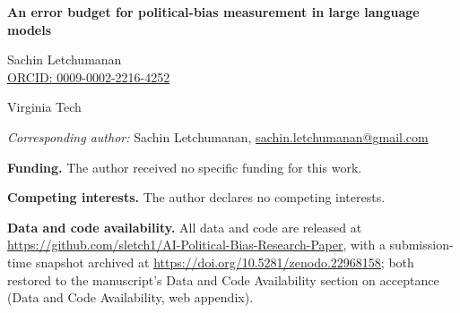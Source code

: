 \documentclass[11pt]{article}
\begin{document}
\begin{center}
{\Large\textbf{An error budget for political-bias measurement in large
language models}}

\vspace{1.5em}
{\large Sachin Letchumanan}\\[2pt]
\href{https://orcid.org/0009-0002-2216-4252}{ORCID: 0009-0002-2216-4252}

\vspace{0.5em}
Virginia Tech

\vspace{0.5em}
\textit{Corresponding author:} Sachin Letchumanan,
\href{mailto:sachin.letchumanan@gmail.com}{sachin.letchumanan@gmail.com}
\end{center}

\vspace{2em}

\textbf{Funding.} The author received no specific funding for this work.

\textbf{Competing interests.} The author declares no competing interests.

\textbf{Data and code availability.} All data and code are released at
\url{https://github.com/sletch1/AI-Political-Bias-Research-Paper}, with a
submission-time snapshot archived at
\url{https://doi.org/10.5281/zenodo.22968158}; both restored to the
manuscript's Data and Code Availability section on acceptance (Data and
Code Availability, web appendix).
\end{document}
